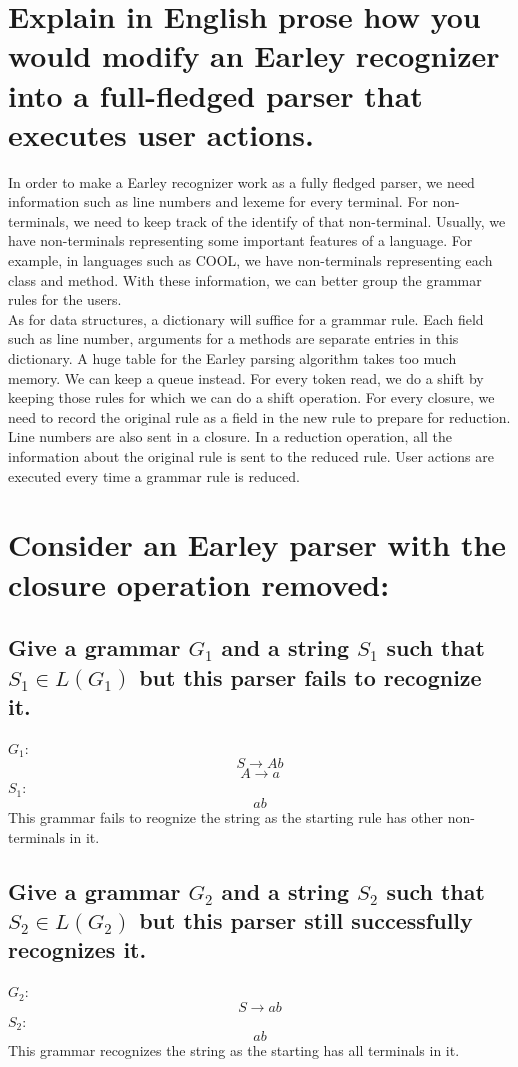 \documentclass[11pt]{article}
\begin{document}
\section{Explain in English prose how you would modify an Earley recognizer into a full-fledged parser that executes user actions.}
In order to make a Earley recognizer work as a fully fledged parser, we need information such as line numbers and lexeme for every terminal. For non-terminals, we need to keep track of the identify of that non-terminal. Usually, we have non-terminals representing some important features of a language. For example, in languages such as COOL, we have non-terminals representing each class and method. With these information, we can better group the grammar rules for the users. \\
As for data structures, a dictionary will suffice for a grammar rule. Each field such as line number, arguments for a methods are separate entries in this dictionary. A huge table for the Earley parsing algorithm takes too much memory. We can keep a queue instead. For every token read, we do a shift by keeping those rules for which we can do a shift operation. For every closure, we need to record the original rule as a field in the new rule to prepare for reduction. Line numbers are also sent in a closure. In a reduction operation, all the information about the original rule is sent to the reduced rule. User actions are executed every time a grammar rule is reduced. 

\section{Consider an Earley parser with the closure operation removed:}

\subsection{Give a grammar $G_{1}$ and a string $S_{1}$ such that $S_{1} \in L(G_{1})$ but this parser fails to recognize it.}
$G_{1}$:
$$S \rightarrow Ab$$
$$A \rightarrow a$$
$S_{1}$:
$$ab$$
This grammar fails to reognize the string as the starting rule has other non-terminals in it.

\subsection{Give a grammar $G_{2}$ and a string $S_{2}$ such that $S_{2} \in L(G_{2})$ but this parser still successfully recognizes it.}
$G_{2}$:
$$S \rightarrow ab$$
$S_{2}$:
$$ab$$
This grammar recognizes the string as the starting has all terminals in it. 
\end{document}
